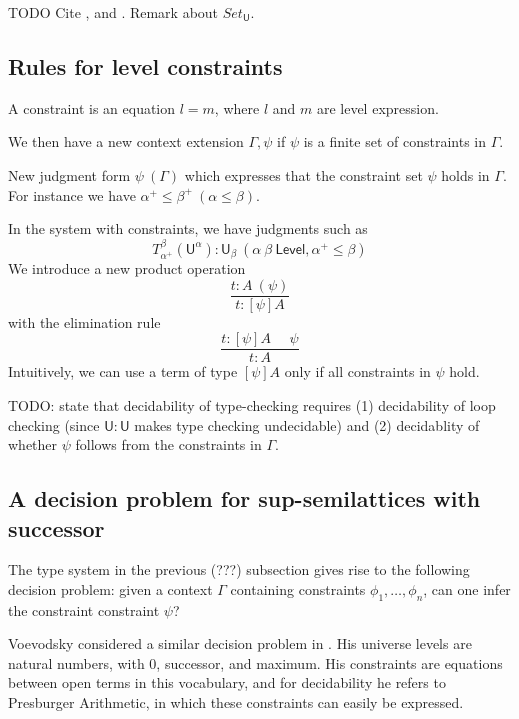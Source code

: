 \documentclass[11pt,a4paper]{article}
\def\UU{\mathsf{U}}
\def\Level{\mathsf{Level}}
\def\Constraint{\mathsf{Constraint}}
\begin{document}
{\color{red}
TODO Cite \cite{giraud:cohom-non-abel}, \cite{chambert-loir:universes-matter}
and \cite{waterhouse:sheaves}. Remark about $Set_\UU$.}

\subsection{Rules for level constraints}%

A constraint is an equation $l = m$, where $l$ and $m$ are level expression.

We then have a new context extension $\Gamma,\psi$ if $\psi$ is a finite set of constraints in $\Gamma$.

New judgment form $\psi~(\Gamma)$ which expresses that the constraint set $\psi$
holds in $\Gamma$. For instance we have $\alpha^+\leqslant\beta^+~(\alpha\leqslant\beta)$.

In the system with constraints, we have judgments such as
$$
T_{\alpha^+}^{\beta}(\UU^{\alpha}):\UU_{\beta}~(\alpha~\beta~\Level,\alpha^+\leqslant\beta)
$$
We introduce a new product operation
$$
\frac{t:A~(\psi)}{t:[\psi]A}
$$
with the elimination rule
$$
\frac{t:[\psi]A~~~~~~\psi}{t:A}
$$
Intuitively, we can use a term of type $[\psi]A$ only if all constraints in $\psi$ hold.

{\color{red}
TODO: state that decidability of type-checking requires (1) decidability of loop checking
(since $\UU:\UU$ makes type checking undecidable) and (2) decidablity of whether $\psi$
follows from the constraints in $\Gamma$.}

\subsection{A decision problem for sup-semilattices with successor}

The type system in the previous (???) subsection gives rise to the following
decision problem: given a context $\Gamma$ containing constraints $\phi_1,\ldots,\phi_n$,
can one infer the constraint constraint $\psi$?

Voevodsky considered a similar decision problem in \cite[Section 2]{VV}.
His universe levels are natural numbers, with 0, successor, and maximum.
His constraints are equations between open terms in this vocabulary,
and for decidability he refers to Presburger Arithmetic,
in which these constraints can easily be expressed.
\end{document}
